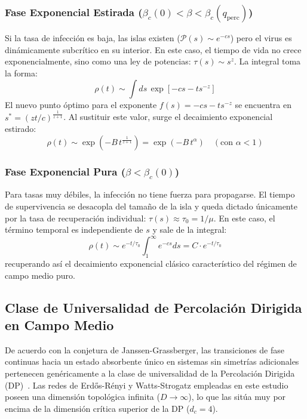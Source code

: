 \documentclass[%
reprint,
amsmath,amssymb,
aps,
]{revtex4-2}
\begin{document}
	\subsubsection{Fase Exponencial Estirada ($\beta_c(0) < \beta < \beta_c(q_{\text{perc}})$)~\cite{Muñoz2010,Noest1986}}
	Si la tasa de infección es baja, las islas existen ($\mathcal{P}(s) \sim e^{-cs}$) pero el virus es dinámicamente subcrítico en su interior. En este caso, el tiempo de vida no crece exponencialmente, sino como una ley de potencias: $\tau(s) \sim s^z$. La integral toma la forma:
	\begin{equation}
		\rho(t) \sim \int ds \, \exp\left[ -c s - t s^{-z} \right]
	\end{equation}
	El nuevo punto óptimo para el exponente $f(s) = -cs - t s^{-z}$ se encuentra en $s^* = (z t / c)^{\frac{1}{z+1}}$. Al sustituir este valor, surge el decaimiento exponencial estirado:
	\begin{equation}
		\rho(t) \sim \exp\left( -B \, t^{\frac{1}{z+1}} \right) = \exp\left( -B \, t^\alpha \right) \quad (\text{con } \alpha < 1)
	\end{equation}
	
	\subsubsection{Fase Exponencial Pura ($\beta < \beta_c(0)$)~\cite{Muñoz2010,Noest1986}}
	Para tasas muy débiles, la infección no tiene fuerza para propagarse. El tiempo de supervivencia se desacopla del tamaño de la isla y queda dictado únicamente por la tasa de recuperación individual: $\tau(s) \approx \tau_0 = 1/\mu$. En este caso, el término temporal es independiente de $s$ y sale de la integral:
	\begin{equation}
		\rho(t) \sim e^{-t/\tau_0} \int_{1}^{\infty} e^{-c s} ds = C \cdot e^{-t/\tau_0}
	\end{equation}
	recuperando así el decaimiento exponencial clásico característico del régimen de campo medio puro.
	
	\subsection{Clase de Universalidad de Percolación Dirigida en Campo Medio}
	\label{apendice:percolacion_dirigida}
	
	De acuerdo con la conjetura de Janssen-Grassberger, las transiciones de fase continuas hacia un estado absorbente único en sistemas sin simetrías adicionales pertenecen genéricamente a la clase de universalidad de la Percolación Dirigida (DP)~\cite{Noest1986,Odor2004}. Las redes de Erdős-Rényi y Watts-Strogatz empleadas en este estudio poseen una dimensión topológica infinita ($D \to \infty$), lo que las sitúa muy por encima de la dimensión crítica superior de la DP ($d_c = 4$).
	
\end{document}
